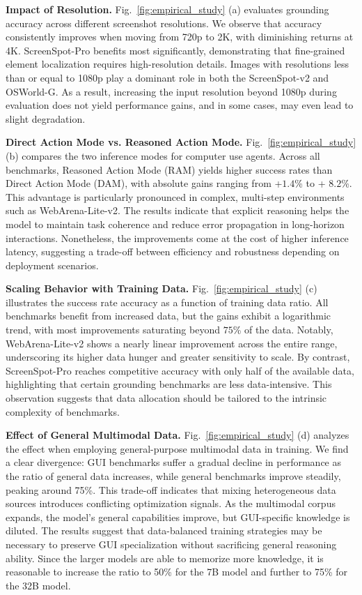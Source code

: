 \documentclass{article} %
\begin{document}
\textbf{Impact of Resolution.}
Fig.~\ref{fig:empirical_study} (a) evaluates grounding accuracy across different screenshot resolutions. We observe that accuracy consistently improves when moving from 720p to 2K, with diminishing returns at 4K. ScreenSpot-Pro benefits most significantly, demonstrating that fine-grained element localization requires high-resolution details. 
% 
Images with resolutions less than or equal to 1080p play a dominant role in both the ScreenSpot-v2 and OSWorld-G. As a result, increasing the input resolution beyond 1080p during evaluation does not yield performance gains, and in some cases, may even lead to slight degradation.

\textbf{Direct Action Mode vs. Reasoned Action Mode.}
Fig.~\ref{fig:empirical_study} (b) compares the two inference modes for computer use agents. Across all benchmarks, Reasoned Action Mode (RAM) yields higher success rates than Direct Action Mode (DAM), with absolute gains ranging from +$1.4$\% to + $8.2$\%. This advantage is particularly pronounced in complex, multi-step environments such as WebArena-Lite-v2. The results indicate that explicit reasoning helps the model to maintain task coherence and reduce error propagation in long-horizon interactions. Nonetheless, the improvements come at the cost of higher inference latency, suggesting a trade-off between efficiency and robustness depending on deployment scenarios.

\textbf{Scaling Behavior with Training Data.}
Fig.~\ref{fig:empirical_study} (c) illustrates the success rate accuracy as a function of training data ratio. All benchmarks benefit from increased data, but the gains exhibit a logarithmic trend, with most improvements saturating beyond $75$\% of the data. Notably, WebArena-Lite-v2 shows a nearly linear improvement across the entire range, underscoring its higher data hunger and greater sensitivity to scale. By contrast, ScreenSpot-Pro reaches competitive accuracy with only half of the available data, highlighting that certain grounding benchmarks are less data-intensive. This observation suggests that data allocation should be tailored to the intrinsic complexity of benchmarks.

\textbf{Effect of General Multimodal Data.}
Fig.~\ref{fig:empirical_study} (d) analyzes the effect when employing general-purpose multimodal data in training. We find a clear divergence: GUI benchmarks suffer a gradual decline in performance as the ratio of general data increases, while general benchmarks improve steadily, peaking around 75\%. This trade-off indicates that mixing heterogeneous data sources introduces conflicting optimization signals. 
As the multimodal corpus expands, the model’s general capabilities improve, but GUI-specific knowledge is diluted.
The results suggest that data-balanced training strategies may be necessary to preserve GUI specialization without sacrificing general reasoning ability. Since the larger models are able to memorize more knowledge, it is reasonable to increase the ratio to 50\% for the 7B model and further to 75\% for the 32B model.
\end{document}
